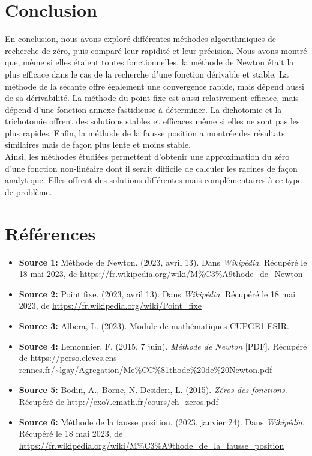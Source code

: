 \documentclass[12pt]{article}
\begin{document}
\section{Conclusion}
\noindent En conclusion, nous avons exploré différentes méthodes algorithmiques de recherche de zéro, puis comparé leur rapidité et leur précision. Nous avons montré que, même si elles étaient toutes fonctionnelles, la méthode de Newton était la plus efficace dans le cas de la recherche d'une fonction dérivable et stable. La méthode de la sécante offre également une convergence rapide, mais dépend aussi de sa dérivabilité. La méthode du point fixe est aussi relativement efficace, mais dépend d'une fonction annexe fastidieuse à déterminer. La dichotomie et la trichotomie offrent des solutions stables et efficaces même si elles ne sont pas les plus rapides. Enfin, la méthode de la fausse position a montrée des résultats similaires mais de façon plus lente et moins stable.\\

\noindent Ainsi, les méthodes étudiées permettent d'obtenir une approximation du zéro d'une fonction non-linéaire dont il serait difficile de calculer les racines de façon analytique. Elles offrent des solutions différentes mais complémentaires à ce type de problème.


\section{Références}
\label{ref:Références}
\begin{itemize}
    \item \textbf{Source 1:} Méthode de Newton. (2023, avril 13). Dans \textit{Wikipédia}. Récupéré le 18 mai 2023, de \url{https://fr.wikipedia.org/wiki/M%C3%A9thode_de_Newton}
    
    \item \textbf{Source 2:} Point fixe. (2023, avril 13). Dans \textit{Wikipédia}. Récupéré le 18 mai 2023, de \url{https://fr.wikipedia.org/wiki/Point_fixe}
    
    \item \textbf{Source 3:} Albera, L. (2023). Module de mathématiques CUPGE1 ESIR.

    \item \textbf{Source 4:} Lemonnier, F. (2015, 7 juin). \textit{Méthode de Newton} [PDF]. Récupéré de \url{https://perso.eleves.ens-rennes.fr/~lgay/Agregation/Me%CC%81thode%20de%20Newton.pdf}

    \item \textbf{Source 5:} Bodin, A., Borne, N. Desideri, L. (2015). \textit{Zéros des fonctions}. Récupéré de \url{http://exo7.emath.fr/cours/ch_zeros.pdf}

    \item \textbf{Source 6:} Méthode de la fausse position. (2023, janvier 24). Dans \textit{Wikipédia}. Récupéré le 18 mai 2023, de \url{https://fr.wikipedia.org/wiki/M%C3%A9thode_de_la_fausse_position}
\end{itemize}
\end{document}
